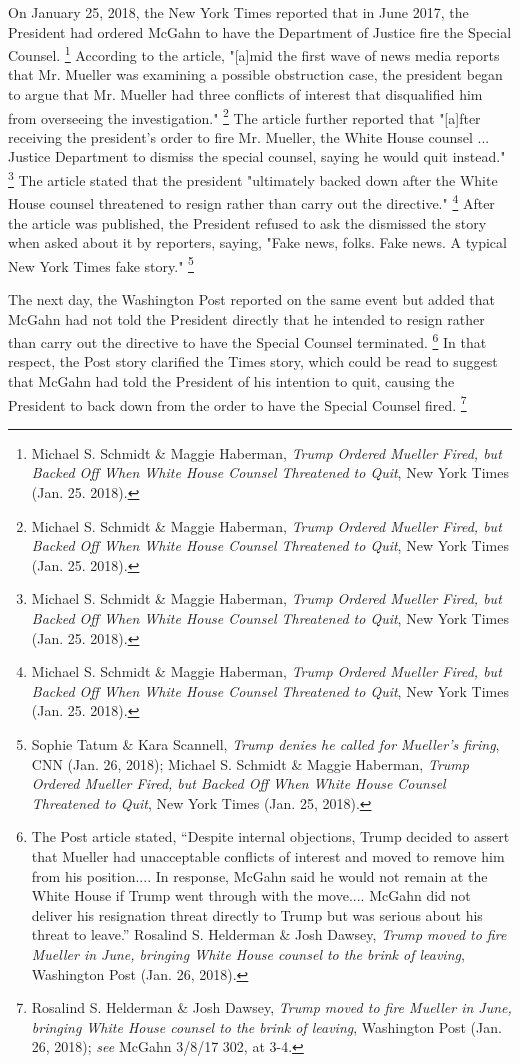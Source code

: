 {On January 25, 2018, the New York Times reported that in June 2017, the President had ordered McGahn to have the Department of Justice fire the Special Counsel.%
\footnote{Michael S. Schmidt \& Maggie Haberman, \textit{Trump Ordered Mueller Fired, but Backed Off When White House Counsel Threatened to Quit}, New York Times (Jan. 25. 2018).}
According to the article, "[a]mid the first wave of news media reports that Mr. Mueller was examining a possible obstruction case, the president began to argue that Mr. Mueller had three conflicts of interest that disqualified him from overseeing the investigation."%
\footnote{Michael S. Schmidt \& Maggie Haberman, \textit{Trump Ordered Mueller Fired, but Backed Off When White House Counsel Threatened to Quit}, New York Times (Jan. 25. 2018).}
The article further reported that "[a]fter receiving the president's order to fire Mr. Mueller, the White House counsel ...
Justice Department to dismiss the special counsel, saying he would quit instead."%
\footnote{Michael S. Schmidt \& Maggie Haberman, \textit{Trump Ordered Mueller Fired, but Backed Off When White House Counsel Threatened to Quit}, New York Times (Jan. 25. 2018).}
The article stated that the president "ultimately backed down after the White House counsel threatened to resign rather than carry out the directive."%
\footnote{Michael S. Schmidt \& Maggie Haberman, \textit{Trump Ordered Mueller Fired, but Backed Off When White House Counsel Threatened to Quit}, New York Times (Jan. 25. 2018).}
After the article was published, the President
refused to ask the
dismissed the story when asked about it by reporters, saying, "Fake news, folks.
Fake news.
A typical New York Times fake story."%
\footnote{Sophie Tatum \& Kara Scannell, \textit{Trump denies he called for Mueller’s firing}, CNN (Jan. 26, 2018);
Michael S. Schmidt \& Maggie Haberman, \textit{Trump Ordered Mueller Fired, but Backed Off When White House Counsel Threatened to Quit}, New York Times (Jan. 25, 2018).}

The next day, the Washington Post reported on the same event but added that McGahn had not told the President directly that he intended to resign rather than carry out the directive to have the Special Counsel terminated.%
\footnote{The Post article stated, “Despite internal objections, Trump decided to assert that Mueller had unacceptable conflicts of interest and moved to remove him from his position....
In response, McGahn said he would not remain at the White House if Trump went through with the move....
McGahn did not deliver his resignation threat directly to Trump but was serious about his threat to leave.”
Rosalind S. Helderman \& Josh Dawsey, \textit{Trump moved to fire Mueller in June, bringing White House counsel to the brink of leaving}, Washington Post (Jan. 26, 2018).}
In that respect, the Post story clarified the Times story, which could be read to suggest that McGahn had told the President of his intention to quit, causing the President to back down from the order to have the Special Counsel fired.%
\footnote{Rosalind S. Helderman \& Josh Dawsey, \textit{Trump moved to fire Mueller in June, bringing White House counsel to the brink of leaving}, Washington Post (Jan. 26, 2018);
\textit{see} McGahn 3/8/17 302, at 3-4.}

}
